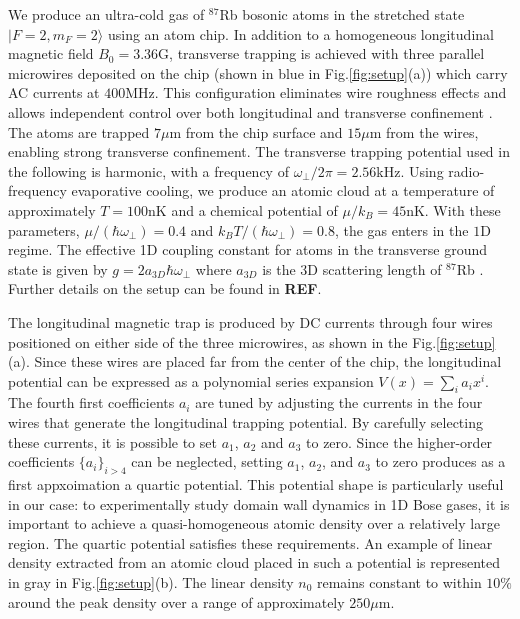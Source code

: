 \documentclass[submission, Phys]{SciPost}
\begin{document}
We produce an ultra-cold gas of $^{87}$Rb bosonic atoms in the stretched state $|F=2,m_F=2 \rangle$ using an atom chip. In addition to a homogeneous longitudinal magnetic field $B_0 = 3.36 $G, transverse trapping is achieved with three parallel microwires deposited on the chip (shown in blue in Fig.\ref{fig:setup}(a)) which carry AC currents at $400$MHz. This configuration eliminates wire roughness effects and allows independent control over both longitudinal and transverse confinement \cite{PhysRevLett.98.263201}. The atoms are trapped $7\mu$m from the chip surface and $15\mu$m from the wires, enabling strong transverse confinement. The transverse trapping potential used in the following is harmonic, with a frequency of $\omega_{\perp}/ 2 \pi=2.56 $kHz. 
Using radio-frequency evaporative cooling, we produce an atomic cloud at a temperature of approximately $T=100$nK and a chemical potential of $\mu/ k_B = 45$nK. With these parameters, $\mu/ (\hbar \omega_{\perp})=0.4$ and $k_B T/ (\hbar \omega_{\perp} )=0.8$, the gas enters in the $1$D regime. The effective 1D coupling constant for atoms in the transverse ground state is given by $g = 2 a_{3D} \hbar \omega_{\perp}$ where $a_{3D}$ is the $3$D scattering length of $^{87}$Rb \cite{PhysRevLett.81.938}. Further details on the setup can be found in \textbf{REF}. 


The longitudinal magnetic trap is produced by DC currents through four wires positioned on either side of the three microwires, as shown in the Fig.\ref{fig:setup}(a). Since these wires are placed far from the center of the chip, the longitudinal potential can be expressed as a polynomial series expansion $V(x)= \sum_{i} a_i x^i$. 
The fourth first coefficients $a_i$ are tuned by adjusting the currents in the four wires that generate the longitudinal trapping potential. By carefully selecting these currents, it is possible to set $a_1$, $a_2$ and $a_3$ to zero. Since the higher-order coefficients $\{a_i\}_{i>4}$ can be neglected, setting $a_1$, $a_2$, and $a_3$ to zero produces as a first appxoimation a quartic potential. This potential shape is particularly useful in our case: to experimentally study domain wall dynamics in 1D Bose gases, it is important to achieve a quasi-homogeneous atomic density over a relatively large region. The quartic potential satisfies these requirements.
An example of linear density extracted from an atomic cloud placed in such a potential is represented in gray in Fig.\ref{fig:setup}(b). The linear density $n_0$ remains constant to within $10 \%$ around the peak density over a range of approximately $250 \mu$m. 
\end{document}
